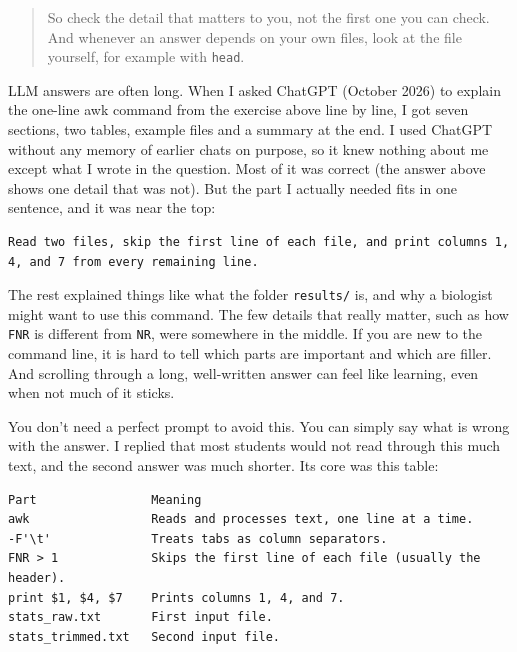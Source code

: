\documentclass[
  letterpaper,
  DIV=11,
  numbers=noendperiod]{scrreprt}
\begin{document}
\begin{tcolorbox}
\begin{quote}
So check the detail that matters to you, not the first one you can
check. And whenever an answer depends on your own files, look at the
file yourself, for example with \texttt{head}.
\end{quote}

\end{tcolorbox}

\begin{tcolorbox}[enhanced jigsaw, title=\textcolor{quarto-callout-tip-color}{\faLightbulb}\hspace{0.5em}{Tip: When the answer is longer than you want to read (optional)}, rightrule=.15mm, titlerule=0mm, colframe=quarto-callout-tip-color-frame, toprule=.15mm, leftrule=.75mm, colbacktitle=quarto-callout-tip-color!10!white, bottomtitle=1mm, toptitle=1mm, arc=.35mm, opacitybacktitle=0.6, left=2mm, bottomrule=.15mm, breakable, opacityback=0, colback=white, coltitle=black]

LLM answers are often long. When I asked ChatGPT (October 2026) to
explain the one-line awk command from the exercise above line by line, I
got seven sections, two tables, example files and a summary at the end.
I used ChatGPT without any memory of earlier chats on purpose, so it
knew nothing about me except what I wrote in the question. Most of it
was correct (the answer above shows one detail that was not). But the
part I actually needed fits in one sentence, and it was near the top:

\begin{verbatim}
Read two files, skip the first line of each file, and print columns 1, 4, and 7 from every remaining line.
\end{verbatim}

The rest explained things like what the folder \texttt{results/} is, and
why a biologist might want to use this command. The few details that
really matter, such as how \texttt{FNR} is different from \texttt{NR},
were somewhere in the middle. If you are new to the command line, it is
hard to tell which parts are important and which are filler. And
scrolling through a long, well-written answer can feel like learning,
even when not much of it sticks.

You don't need a perfect prompt to avoid this. You can simply say what
is wrong with the answer. I replied that most students would not read
through this much text, and the second answer was much shorter. Its core
was this table:

\begin{verbatim}
Part                Meaning
awk                 Reads and processes text, one line at a time.
-F'\t'              Treats tabs as column separators.
FNR > 1             Skips the first line of each file (usually the header).
print $1, $4, $7    Prints columns 1, 4, and 7.
stats_raw.txt       First input file.
stats_trimmed.txt   Second input file.
\end{verbatim}


\end{tcolorbox}
\end{document}
